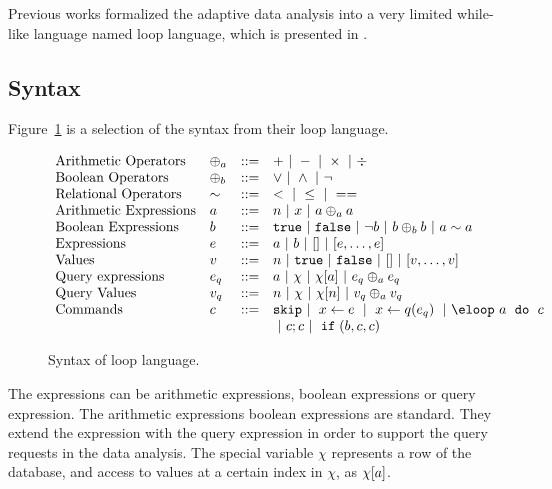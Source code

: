Previous works formalized the adaptive data analysis into a very limited while-like language named loop language,
which is presented in .
\subsection*{Syntax}
Figure~\ref{fig:prework_syntax} is a selection of the syntax from their loop language.
{\small
\begin{figure}
\[
\begin{array}{llll}
 \mbox{Arithmetic Operators} & \oplus_a & ::= & + ~|~ - ~|~ \times 
%
~|~ \div \\  
  \mbox{Boolean Operators} & \oplus_b & ::= & \lor ~|~ \land ~|~ \neg\\
   \mbox{Relational Operators} & \sim & ::= & < ~|~ \leq ~|~ == \\  
\mbox{Arithmetic Expressions} & \aexpr & ::= & 
	n ~|~ x ~|~ \aexpr \oplus_a \aexpr  \\
\mbox{Boolean Expressions} & \bexpr & ::= & 
	\etrue ~|~ \efalse  ~|~ \neg \bexpr
	 ~|~ \bexpr \oplus_b \bexpr
	~|~ \aexpr \sim \aexpr \\
\mbox{Expressions} & \expr & ::= & \aexpr ~|~ \bexpr ~|~ [] ~|~ [\expr, \dots, \expr] \\	
\mbox{Values} & v & ::= & n ~|~ \etrue ~|~ \efalse ~|~ [] ~|~ [v, \dots, v] \\
\mbox{Query expressions} & \expr_q & ::= & \aexpr ~|~ \chi ~|~ \chi[\aexpr] ~|~ \expr_q \oplus_a \expr_q \\
\mbox{Query Values} & v_q & ::= & n ~|~ \chi ~|~ \chi[n] ~|~ v_q \oplus_a  v_q \\
\mbox{Commands} & c & ::= &  \eskip  ~|~  \assign x \expr ~|~  \assign{x}{ q(\expr_q)}
%
~|~ \eloop ~ \aexpr  ~ \edo ~ c  \\ &&& ~|~ c;c  ~|~ \eif(\bexpr, c, c)
\end{array}
\]
 \caption{Syntax of loop language.}
    \label{fig:prework_syntax}
\end{figure}
}
The expressions can be arithmetic expressions, boolean expressions or query expression.
The arithmetic expressions boolean expressions are standard.
They extend the expression with the query expression in order to support the query requests in the data analysis.
The special variable $\chi$ represents a row of the database,
and access to values at a certain index in $\chi$, as $\chi[a]$.
